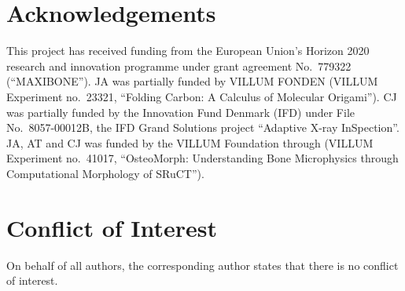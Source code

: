 \section{Acknowledgements}

This project has received funding from the European Union’s Horizon 2020 research and innovation programme under grant agreement No.~779322 (``MAXIBONE'').
JA was partially funded by VILLUM FONDEN (VILLUM Experiment no.~23321, “Folding Carbon: A Calculus of Molecular Origami”).
CJ was partially funded by the Innovation Fund Denmark (IFD) under File No.~8057-00012B, the IFD Grand Solutions project ``Adaptive X-ray InSpection''.
JA, AT and CJ was funded by the VILLUM Foundation through (VILLUM Experiment no.~41017, “OsteoMorph: Understanding Bone Microphysics through Computational Morphology of SRuCT”).

\section{Conflict of Interest}
On behalf of all authors, the corresponding author states that there is no conflict of interest.



